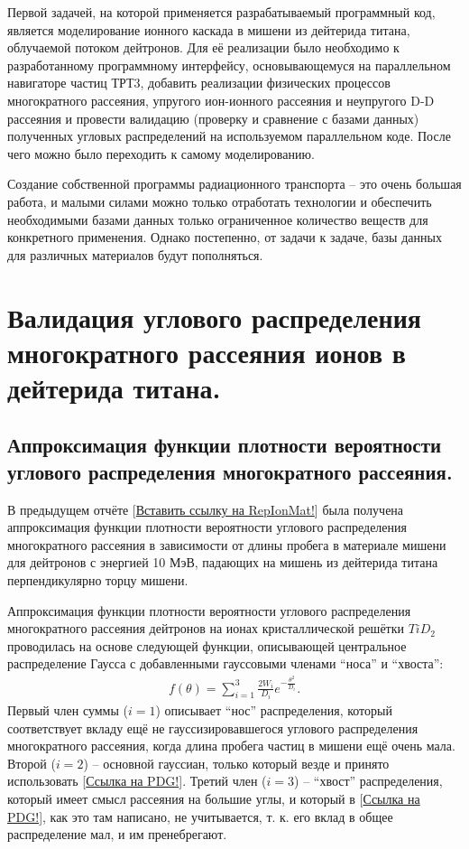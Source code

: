 \documentclass[a4paper,12pt]{article}
\begin{document}
\begin{large}
    Первой задачей, на которой применяется разрабатываемый программный код, является моделирование ионного каскада в мишени из дейтерида титана, облучаемой потоком дейтронов. Для её реализации было необходимо к разработанному программному интерфейсу, основывающемуся на параллельном навигаторе частиц ТРТ3, добавить реализации физических процессов многократного рассеяния, упругого ион-ионного рассеяния и неупругого D-D рассеяния и провести валидацию (проверку и сравнение с базами данных) полученных угловых распределений на используемом параллельном коде. После чего можно было переходить к самому моделированию. 
   
   Создание собственной программы радиационного транспорта -- это очень большая работа, и малыми силами можно только отработать технологии и обеспечить необходимыми базами данных только ограниченное количество веществ для конкретного применения.
   Однако постепенно, от задачи к задаче, базы данных для различных материалов будут пополняться.
   
   
\clearpage{}
\section{Валидация углового распределения многократного рассеяния ионов в дейтерида титана.}
\label{ValMS}

\subsection{Аппроксимация функции плотности вероятности углового распределения многократного рассеяния.}
\label{subValMS1}

	В предыдущем отчёте [\underline{Вставить ссылку на RepIonMat!}] была получена аппроксимация функции плотности вероятности углового распределения многократного рассеяния в зависимости от длины пробега в материале мишени для дейтронов с энергией 10 МэВ, падающих на мишень из дейтерида титана перпендикулярно торцу мишени.
 
	Аппроксимация функции плотности вероятности углового распределения многократного рассеяния дейтронов на ионах кристаллической решётки $TiD_2$ проводилась на основе следующей функции, описывающей центральное распределение Гаусса с добавленными гауссовыми членами ``носа'' и ``хвоста'':
\begin{equation}
\label{MSApproximationFunction}
\begin{aligned} 
f(\theta)=\sum_{i=1}^{3} \frac{2W_i}{D_i}e^{-\frac{\theta^2}{D_i}}.
\end{aligned}
\end{equation}
  Первый член суммы ($i=1$) описывает ``нос'' распределения, который соответствует вкладу ещё не гауссизировавшегося углового распределения многократного рассеяния, когда длина пробега частиц в мишени ещё очень мала. Второй ($i=2$) -- основной гауссиан, только который везде и принято использовать [\underline{Ссылка на PDG!}]. Третий член ($i=3$) --  ``хвост'' распределения, который имеет смысл рассеяния на большие углы, и который в [\underline{Ссылка на PDG!}], как это там написано, не учитывается, т. к. его вклад в общее распределение мал, и им пренебрегают.
  

\end{large}
\end{document}

